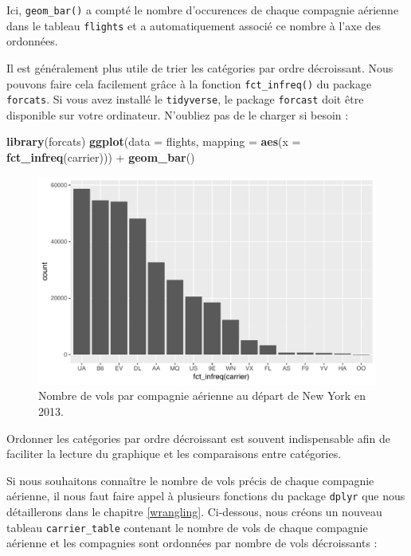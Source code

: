 \documentclass[a4paperpaper,]{article}
\newenvironment{Shaded}{\begin{snugshade}}{\end{snugshade}}
\newcommand{\DataTypeTok}[1]{\textcolor[rgb]{0.00,0.34,0.68}{#1}}
\newcommand{\KeywordTok}[1]{\textcolor[rgb]{0.12,0.11,0.11}{\textbf{#1}}}
\newcommand{\NormalTok}[1]{\textcolor[rgb]{0.12,0.11,0.11}{#1}}
\newcommand{\OperatorTok}[1]{\textcolor[rgb]{0.12,0.11,0.11}{#1}}
\newcommand{\StringTok}[1]{\textcolor[rgb]{0.75,0.01,0.01}{#1}}
\theoremstyle{definition}
\theoremstyle{definition}
\theoremstyle{definition}
\theoremstyle{remark}
\begin{document}
Ici, \texttt{geom\_bar()} a compté le nombre d'occurences de chaque
compagnie aérienne dans le tableau \texttt{flights} et a automatiquement
associé ce nombre à l'axe des ordonnées.

Il est généralement plus utile de trier les catégories par ordre
décroissant. Nous pouvons faire cela facilement grâce à la fonction
\texttt{fct\_infreq()} du package \texttt{forcats}. Si vous avez
installé le \texttt{tidyverse}, le package \texttt{forcast} doit être
disponible sur votre ordinateur. N'oubliez pas de le charger si besoin :

\begin{Shaded}
\begin{Highlighting}[]
\KeywordTok{library}\NormalTok{(forcats)}
\KeywordTok{ggplot}\NormalTok{(}\DataTypeTok{data =}\NormalTok{ flights, }\DataTypeTok{mapping =} \KeywordTok{aes}\NormalTok{(}\DataTypeTok{x =} \KeywordTok{fct_infreq}\NormalTok{(carrier))) }\OperatorTok{+}
\StringTok{  }\KeywordTok{geom_bar}\NormalTok{()}
\end{Highlighting}
\end{Shaded}

\begin{figure}[htpb]

{\centering \includegraphics[width=0.9\linewidth]{figure/bpcarriersorted-1} 

}

\caption{Nombre de vols par compagnie aérienne au départ de New York en 2013.}\label{fig:bpcarriersorted}
\end{figure}

Ordonner les catégories par ordre décroissant est souvent indispensable
afin de faciliter la lecture du graphique et les comparaisons entre
catégories.

Si nous souhaitons connaître le nombre de vols précis de chaque
compagnie aérienne, il nous faut faire appel à plusieurs fonctions du
package \texttt{dplyr} que nous détaillerons dans le chapitre
\ref{wrangling}. Ci-dessous, nous créons un nouveau tableau
\texttt{carrier\_table} contenant le nombre de vols de chaque compagnie
aérienne et les compagnies sont ordonnées par nombre de vols
décroissants :
\end{document}
